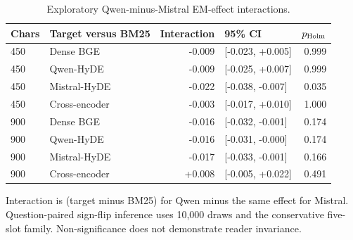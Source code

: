 \begin{table}[!htbp]
\centering\footnotesize
\caption{Exploratory Qwen-minus-Mistral EM-effect interactions.}
\label{tab:mhrag_interactions}
\begin{threeparttable}
\setlength{\tabcolsep}{3pt}
\begin{tabular}{llrlr}
\toprule
Chars & Target versus BM25 & Interaction & 95\% CI & $p_{\rm Holm}$ \\
\midrule
450 & Dense BGE & -0.009 & [-0.023, +0.005] & 0.999 \\
450 & Qwen-HyDE & -0.009 & [-0.025, +0.007] & 0.999 \\
450 & Mistral-HyDE & -0.022 & [-0.038, -0.007] & 0.035 \\
450 & Cross-encoder & -0.003 & [-0.017, +0.010] & 1.000 \\
900 & Dense BGE & -0.016 & [-0.032, -0.001] & 0.174 \\
900 & Qwen-HyDE & -0.016 & [-0.031, -0.000] & 0.174 \\
900 & Mistral-HyDE & -0.017 & [-0.033, -0.001] & 0.166 \\
900 & Cross-encoder & +0.008 & [-0.005, +0.022] & 0.491 \\
\bottomrule
\end{tabular}
\begin{tablenotes}\scriptsize\item Interaction is (target minus BM25) for Qwen minus the same effect for Mistral. Question-paired sign-flip inference uses 10,000 draws and the conservative five-slot family. Non-significance does not demonstrate reader invariance.
\end{tablenotes}
\end{threeparttable}
\end{table}
